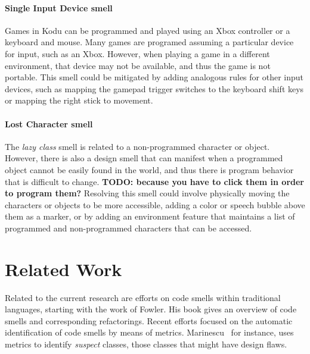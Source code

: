 \documentclass{sig-alternate}
\newcommand{\todo}[1]{\textbf{TODO: #1}}
\begin{document}
\paragraph{Single Input Device smell}
Games in Kodu can be programmed and played using an Xbox controller or a keyboard and mouse. Many games are programed assuming a particular device for input, such as an Xbox. However, when playing a game in a different environment, that device may not be available, and thus the game is not portable. This smell could be mitigated by adding analogous rules for other input devices, such as mapping the gamepad trigger switches to the keyboard shift keys or mapping the right stick to movement. 

\paragraph{Lost Character smell}
The \emph{lazy class} smell is related to a non-programmed character or object. However, there is also a design smell that can manifest when a programmed object cannot be easily found in the world, and thus there is program behavior that is difficult to change. \todo{because you have to click them in order to program them?} Resolving this smell could involve physically moving the characters or objects to be more accessible, adding a color or speech bubble above them as a marker, or by adding an environment feature that maintains a list of programmed and non-programmed characters that can be accessed. 	

\section{Related Work}

\label{sec:related_work}
Related to the current research are efforts on code smells within traditional languages, starting with the work of Fowler\cite{Fowl1999}. His book gives an overview of code smells and corresponding refactorings. Recent efforts focused on the automatic identification of code smells by means of metrics. Marinescu~\cite{Mari2001} for instance, uses metrics to identify \emph{suspect} classes, those classes that might have design flaws. 
\end{document}
